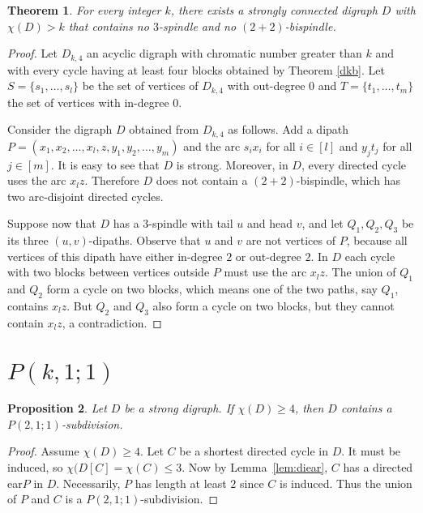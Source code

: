 \documentclass[utf8,10pt]{article}
\theoremstyle{plain}
\newtheorem{theorem}{Theorem}
\newtheorem{proposition}[theorem]{Proposition}
\theoremstyle{definition}
\theoremstyle{remark}
\begin{document}
\begin{theorem}
For every integer $k$, there exists a strongly connected digraph $D$ with $\chi(D) >k$ that contains no $3$-spindle and no $(2+2)$-bispindle. 
\end{theorem}

\begin{proof}
Let $D_{k,4}$ an acyclic digraph with chromatic number greater than $k$ and with every cycle having at least four blocks obtained by Theorem \ref{dkb}.
Let $S = \{s_1, \dots,  s_l\}$ be the set of vertices of $D_{k,4}$ with out-degree 0 and $T = \{t_1, \dots, t_m\}$ the set of vertices with in-degree 0.

Consider the digraph $D$ obtained from $D_{k,4}$ as follows. Add a dipath  $P = (x_1,x_2, \dots , x_l,z,y_1,y_2,\dots, y_m)$ and the arc $s_ix_i$ for all $i\in [l]$ and
$y_jt_j$ for all $j\in [m]$. It is easy to see that $D$ is strong.
Moreover, in $D$, every directed cycle uses the arc $x_lz$. Therefore $D$ does not contain a $(2+2)$-bispindle, which has two arc-disjoint directed cycles. 

Suppose now that $D$ has a $3$-spindle with tail $u$ and head $v$, and let $Q_1, Q_2, Q_3$ be its three $(u,v)$-dipaths. Observe that $u$ and $v$ are not vertices of $P$, because all vertices of this dipath have either in-degree $2$ or out-degree $2$. In $D$ each cycle with two blocks between vertices outside $P$ must use the arc $x_lz$. The union of $Q_1$ and $Q_2$ form a cycle on two blocks, 
which means one of the two paths, say $Q_1$, contains $x_lz$. But $Q_2$ and $Q_3$ also form a cycle on two blocks, but they cannot contain $x_lz$, a contradiction.
\end{proof}




\section{$P(k,1;1)$}\label{sec:k,1,1}



\begin{proposition}\label{prop:p211}
Let $D$ be a strong digraph.
If $\chi(D)\geq 4$, then $D$ contains a $P(2,1;1)$-subdivision.
\end{proposition}
\begin{proof}
Assume  $\chi(D)\geq 4$.
Let $C$ be a shortest directed cycle in $D$. 
It must be induced, so $\chi(D[C]=\chi(C) \leq 3$. 
Now by Lemma~\ref{lem:diear}, $C$ has a directed ear$P$ in $D$. Necessarily, $P$ has length at least $2$ since $C$ is induced.
Thus the union of $P$ and $C$ is a $P(2,1;1)$-subdivision.
\end{proof}
\end{document}
